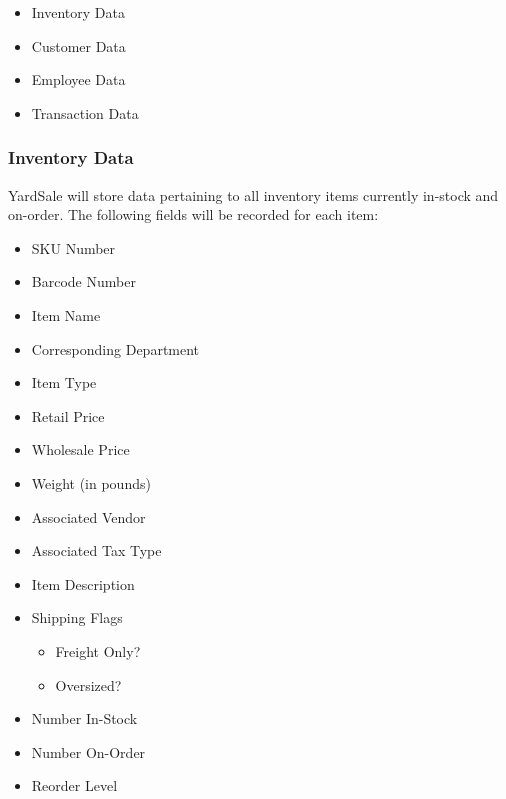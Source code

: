 \documentclass{report}
\begin{document}
            \begin{itemize}
                \item{Inventory Data}
                \item{Customer Data}
                \item{Employee Data}
                \item{Transaction Data}
            \end{itemize}

            \subsubsection{Inventory Data}
                YardSale will store data pertaining to all
                inventory items currently in-stock and on-order.
                The following fields will be recorded for each
                item:

                \begin{itemize}
                    \item SKU Number
                    \item Barcode Number
                    \item Item Name
                    \item Corresponding Department
                    \item Item Type
                    \item Retail Price
                    \item Wholesale Price
                    \item Weight (in pounds)
                    \item Associated Vendor
                    \item Associated Tax Type
                    \item Item Description
                    \item Shipping Flags
                    \begin{itemize}
                        \item Freight Only?
                        \item Oversized?
                    \end{itemize}
                    \item Number In-Stock
                    \item Number On-Order
                    \item Reorder Level
                \end{itemize}
\end{document}
